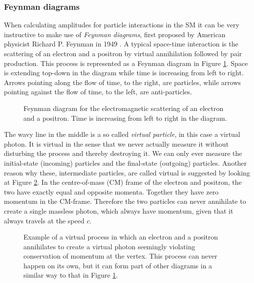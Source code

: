\subsubsection{Feynman diagrams}
When calculating amplitudes for particle interactions in the SM it can be very instructive to make use of \emph{Feynman diagrams}, first proposed by American physicist Richard P. Feynman in 1949 \cite{feynman1949sta}. A typical space-time interaction is the scattering of an electron and a positron by virtual annihilation followed by pair production. This process is represented as a Feynman diagram in Figure \ref{fig:feyn:ee_a_ee}. Space is extending top-down in the diagram while time is increasing from left to right. Arrows pointing along the flow of time, to the right, are particles, while arrows pointing against the flow of time, to the left, are anti-particles.

\begin{figure}[htp]
\centering
	
\caption{Feynman diagram for the electromagnetic scattering of an electron and a positron. Time is increasing from left to right in the diagram.} \label{fig:feyn:ee_a_ee}
\end{figure}

The wavy line in the middle is a so called \emph{virtual particle}, in this case a virtual photon. It is virtual in the sense that we never actually measure it without disturbing the process and thereby destroying it. We can only ever measure the initial-state (incoming) particles and the final-state (outgoing) particles. Another reason why these, intermediate particles, are called virtual is suggested by looking at Figure \ref{fig:feyn:ee_a}. In the centre-of-mass (CM) frame of the electron and positron, the two have exactly equal and opposite momenta. Together they have zero momentum in the CM-frame. Therefore the two particles can never annihilate to create a single massless photon, which always have momentum, given that it always travels at the speed $c$. \cite{griffiths1987iep}

\begin{figure}[htp]
\centering
	
\caption{Example of a virtual process in which an electron and a positron annihilates to create a virtual photon seemingly violating conservation of momentum at the vertex. This process can never happen on its own, but it can form part of other diagrams in a similar way to that in Figure \ref{fig:feyn:ee_a_ee}.} \label{fig:feyn:ee_a}
\end{figure}

